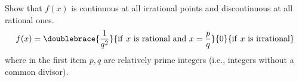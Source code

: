 Show that $f(x)$ is continuous at all irrational points and discontinuous at all rational ones.
\[
f(x)=\doublebrace{\frac{1}{q^2}}{\mathrm{if~}x\mathrm{~is~rational~and~} x=\frac{p}{q} }{0}{\mathrm{if~}x~\mathrm{is~irrational}}
\]
where in the first item $p,q$ are relatively prime integers (i.e., integers without a common divisor).
